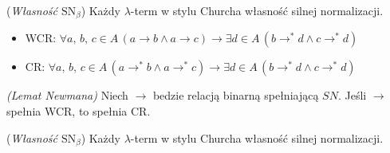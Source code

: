 \begin{twierdzenie} 
  (\emph{Własność \(\mathrm{SN}_{\beta}\)}) Każdy \(\lambda\)-term w stylu Churcha własność silnej normalizacji.
\end{twierdzenie}
\begin{itemize}
\item WCR: \(\forall a,\,b,\,c\in A\, (a\longrightarrow b \land a\longrightarrow c)\to \exists d\in A\,(b\longrightarrow^{*} d \land c\longrightarrow^{*} d)\)
\item CR: \(\forall a,\,b,\,c\in A\, (a\longrightarrow^{*} b \land a\longrightarrow^{*}c)\to \exists d\in A\,(b\longrightarrow^{*} d \land c\longrightarrow^{*} d)\)
\end{itemize}
\begin{twierdzenie} 
  \emph{(Lemat Newmana)} Niech \(\to\) bedzie relacją binarną spełniającą \(SN\). Jeśli \(\to\) spełnia WCR, to spełnia CR.
\end{twierdzenie}
\begin{dowod}
\end{dowod}

\begin{twierdzenie} 
  (\emph{Własność \(\mathrm{SN}_{\beta}\)}) Każdy \(\lambda\)-term w stylu Churcha własność silnej normalizacji.
\end{twierdzenie}
\begin{dowod}
\end{dowod}

